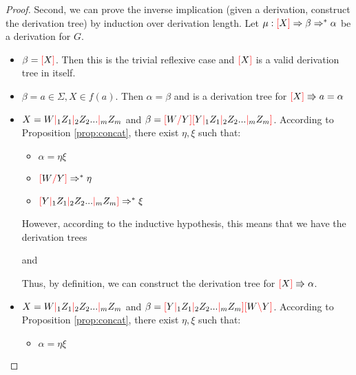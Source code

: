 \documentclass[main.tex]{subfiles}
\begin{document}
\begin{proof}
    Second, we can prove the inverse implication (given a derivation,
    construct the derivation tree) by induction over derivation
    length. Let $\mu: \textcolor{red}{[} X \textcolor{red}{]} \Rightarrow \beta \Rightarrow^* \alpha$
    be a derivation for $G$.
    \begin{itemize}
        \item $\beta = \textcolor{red}{[} X \textcolor{red}{]}$. Then this is the trivial reflexive case
            and $\textcolor{red}{[} X \textcolor{red}{]}$ is a valid derivation tree in itself.
        \item $\beta = a \in \Sigma, X \in f(a)$. Then $\alpha = \beta$ and
            is a derivation tree for $ \textcolor{red}{[} X \textcolor{red}{]} \Rrightarrow a = \alpha $
        \item $X = W \textcolor{red}{|}_1 Z_1 \textcolor{red}{|}_2 Z_2 ... \textcolor{red}{|}_m Z_m$ and
            $\beta = \textcolor{red}{[} W \textcolor{red}{/} Y \textcolor{red}{]} \textcolor{red}{[} Y \textcolor{red}{|}_1 Z_1 \textcolor{red}{|}_2 Z_2 ... \textcolor{red}{|}_m Z_m \textcolor{red}{]}$.
            According to Proposition \ref{prop:concat}, there exist $\eta, \xi$ such that:
            \begin{itemize}
                \item $\alpha = \eta \xi$
                \item $\textcolor{red}{[} W \textcolor{red}{/} Y \textcolor{red}{]} \Rightarrow^* \eta$
                \item $\textcolor{red}{[} Y \textcolor{red}{|}_1 Z_1 \textcolor{red}{|}_2 Z_2 ... \textcolor{red}{|}_m Z_m \textcolor{red}{]} \Rightarrow^* \xi$
            \end{itemize}
            However, according to the inductive hypothesis, this means that we
            have the derivation trees
            \begin{center}
                and
            \end{center}
            Thus, by definition, we can construct the derivation tree
            for $\textcolor{red}{[} X \textcolor{red}{]} \Rrightarrow \alpha$.
        \item $X = W \textcolor{red}{|}_1 Z_1 \textcolor{red}{|}_2 Z_2 ... \textcolor{red}{|}_m Z_m$ and
            $\beta = \textcolor{red}{[} Y \textcolor{red}{|}_1 Z_1 \textcolor{red}{|}_2 Z_2 ... \textcolor{red}{|}_m Z_m \textcolor{red}{]} \textcolor{red}{[} W \textcolor{red}{\backslash} Y \textcolor{red}{]}$.
            According to Proposition \ref{prop:concat}, there exist $\eta, \xi$ such that:
            \begin{itemize}
                \item $\alpha = \eta \xi$

\end{itemize}
\end{itemize}
\end{proof}
\end{document}
